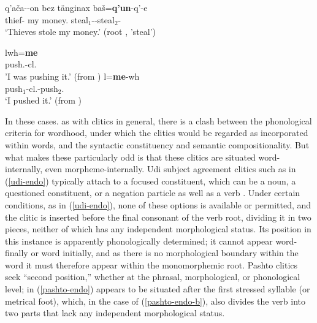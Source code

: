 \documentclass[output=paper]{langsci/langscibook}
\begin{document}
\begin{exe}
	\ex\label{udi-endo}
	\gll q'a\v{c}a--on bez t\"{a}nginax ba\v{s}=\textbf{q'un}-q'-e \\
	thief- my money. steal$_{1}$--steal$_{2}$- \\
	\glt `Thieves stole my money.' (root , 'steal')
\end{exe}


\begin{exe}
	\ex\label{pashto-endo}
	\begin{xlist}
		\ex\label{pashto-endo-a}
		\gll \textrtailt{}lwh=\textbf{me} \\
		push.-cl. \\
		\glt 'I was pushing it.' (from \citealt{Tegey1977,Dost2007})
		\ex\label{pashto-endo-b}
		\gll \textrtailt{}l=\textbf{me}-wh \\
		push$_{1}$-cl.-push$_{2}$. \\
		\glt `I pushed it.' (from \citealt{Tegey1977,Dost2007})
	\end{xlist}
\end{exe}

In these cases. as with clitics in general, there is a clash between the phonological criteria for wordhood, under which the clitics would be regarded as incorporated within words, and the syntactic constituency and semantic compositionality.
But what makes these particularly odd is that these clitics are situated word-internally, even morpheme-internally.
Udi subject agreement clitics such as  in (\ref{udi-endo}) typically attach to a focused constituent, which can be a noun, a questioned constituent, or a negation particle as well as a verb \citep{Harris2000}.
Under certain conditions, as in (\ref{udi-endo}), none of these options is available or permitted, and the clitic is inserted before the final consonant of the verb root, dividing it in two pieces, neither of which has any independent morphological status.
Its position in this instance is apparently phonologically determined; it cannot appear word-finally or word initially, and as there is no morphological boundary within the word it must therefore appear within the monomorphemic root.
Pashto clitics seek ``second position,'' whether at the phrasal, morphological, or phonological level;  in (\ref{pashto-endo}) appears to be situated after the first stressed syllable (or metrical foot), which, in the case of (\ref{pashto-endo-b}), also divides the verb into two parts that lack any independent morphological status.
\end{document}
